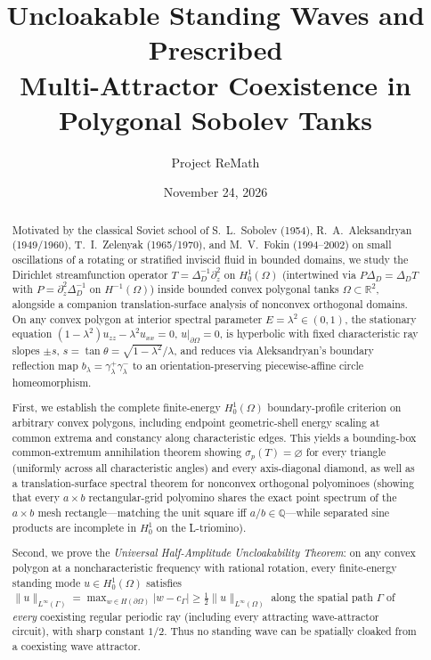 \documentclass[11pt,reqno]{amsart}
\title[Uncloakable Standing Waves and Multi-Attractor Coexistence]{Uncloakable Standing Waves and Prescribed\\
Multi-Attractor Coexistence in Polygonal Sobolev Tanks}
\author{Project ReMath}
\date{November 24, 2026}
\theoremstyle{definition}
\theoremstyle{remark}
\newcommand{\R}{\mathbb{R}}
\newcommand{\Q}{\mathbb{Q}}
\begin{document}
\begin{abstract}
Motivated by the classical Soviet school of S.~L.~Sobolev (1954), R.~A.~Aleksandryan (1949/1960), T.~I.~Zelenyak (1965/1970), and M.~V.~Fokin (1994--2002) on small oscillations of a rotating or stratified inviscid fluid in bounded domains, we study the Dirichlet streamfunction operator $T = \Delta_D^{-1}\partial_z^2$ on $H_0^1(\Omega)$ (intertwined via $P\Delta_D = \Delta_D T$ with $P = \partial_z^2 \Delta_D^{-1}$ on $H^{-1}(\Omega)$) inside bounded convex polygonal tanks $\Omega \subset \R^2$, alongside a companion translation-surface analysis of nonconvex orthogonal domains. On any convex polygon at interior spectral parameter $E = \lambda^2 \in (0,1)$, the stationary equation $(1-\lambda^2)u_{zz} - \lambda^2 u_{xx} = 0$, $u|_{\partial\Omega} = 0$, is hyperbolic with fixed characteristic ray slopes $\pm s$, $s = \tan\theta = \sqrt{1-\lambda^2}/\lambda$, and reduces via Aleksandryan's boundary reflection map $b_\lambda = \gamma_\lambda^+\gamma_\lambda^-$ to an orientation-preserving piecewise-affine circle homeomorphism.

First, we establish the complete finite-energy $H_0^1(\Omega)$ boundary-profile criterion on arbitrary convex polygons, including endpoint geometric-shell energy scaling at common extrema and constancy along characteristic edges. This yields a bounding-box common-extremum annihilation theorem showing $\sigma_p(T) = \varnothing$ for every triangle (uniformly across all characteristic angles) and every axis-diagonal diamond, as well as a translation-surface spectral theorem for nonconvex orthogonal polyominoes (showing that every $a\times b$ rectangular-grid polyomino shares the exact point spectrum of the $a\times b$ mesh rectangle---matching the unit square iff $a/b \in \Q$---while separated sine products are incomplete in $H_0^1$ on the L-triomino).

Second, we prove the \emph{Universal Half-Amplitude Uncloakability Theorem}: on any convex polygon at a noncharacteristic frequency with rational rotation, every finite-energy standing mode $u \in H_0^1(\Omega)$ satisfies $\|u\|_{L^\infty(\Gamma)} = \max_{w \in H(\partial\Omega)} |w - c_\Gamma| \ge \frac{1}{2}\|u\|_{L^\infty(\Omega)}$ along the spatial path $\Gamma$ of \emph{every} coexisting regular periodic ray (including every attracting wave-attractor circuit), with sharp constant $1/2$. Thus no standing wave can be spatially cloaked from a coexisting wave attractor.


\end{abstract}
\end{document}
